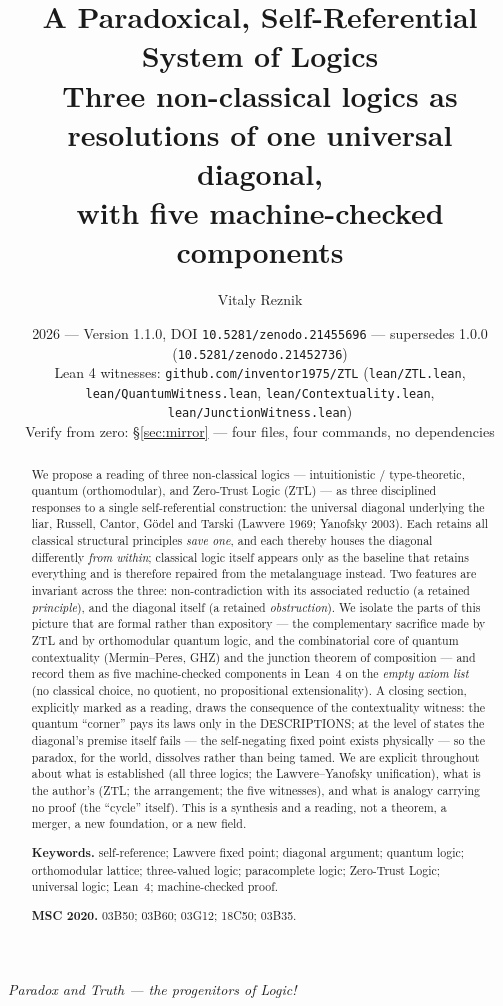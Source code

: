 \documentclass[11pt]{article}
\title{\textbf{A Paradoxical, Self-Referential System of Logics}\\[4pt]
\large Three non-classical logics as resolutions of one universal diagonal,\\
with five machine-checked components}
\author{Vitaly Reznik}
\date{2026 --- Version 1.1.0, DOI \texttt{10.5281/zenodo.21455696} --- supersedes 1.0.0 (\texttt{10.5281/zenodo.21452736})\\[2pt]
\small Lean 4 witnesses: \texttt{github.com/inventor1975/ZTL}
(\texttt{lean/ZTL.lean}, \texttt{lean/QuantumWitness.lean}, \texttt{lean/Contextuality.lean}, \texttt{lean/JunctionWitness.lean})\\
\small Verify from zero: \S\ref{sec:mirror} --- four files, four commands, no dependencies}
\theoremstyle{remark}
\begin{document}
\maketitle

\begin{center}
\emph{Paradox and Truth --- the progenitors of Logic!}
\end{center}
\vspace{4pt}

\begin{abstract}
We propose a reading of three non-classical logics ---
intuitionistic / type-theoretic, quantum (orthomodular), and Zero-Trust
Logic (ZTL) --- as three disciplined responses to a single self-referential
construction: the universal diagonal underlying the liar, Russell, Cantor,
G\"odel and Tarski (Lawvere 1969; Yanofsky 2003). Each retains all classical
structural principles \emph{save one}, and each thereby houses the diagonal
differently \emph{from within}; classical logic itself appears only as the
baseline that retains everything and is therefore repaired from the
metalanguage instead. Two features are invariant across the three: non-contradiction
with its associated reductio (a retained \emph{principle}), and the diagonal
itself (a retained \emph{obstruction}). We isolate the parts of this
picture that are formal rather than expository --- the complementary sacrifice
made by ZTL and by orthomodular quantum logic, and the combinatorial core of
quantum contextuality (Mermin--Peres, GHZ) and the junction theorem of
composition --- and record them as five machine-checked components in Lean~4 on the \emph{empty axiom list} (no
classical choice, no quotient, no propositional extensionality). A closing
section, explicitly marked as a reading, draws the consequence of the
contextuality witness: the quantum ``corner'' pays its laws only in the
DESCRIPTIONS; at the level of states the diagonal's premise itself fails ---
the self-negating fixed point exists physically --- so the paradox, for the
world, dissolves rather than being tamed. We are
explicit throughout about what is established (all three logics; the
Lawvere--Yanofsky unification), what is the author's (ZTL; the arrangement;
the five witnesses), and what is analogy carrying no proof (the ``cycle''
itself). This is a synthesis and a reading, not a theorem, a merger, a new
foundation, or a new field.

\smallskip
\noindent\textbf{Keywords.} self-reference; Lawvere fixed point; diagonal
argument; quantum logic; orthomodular lattice; three-valued logic;
paracomplete logic; Zero-Trust Logic; universal logic; Lean~4;
machine-checked proof.

\smallskip
\noindent\textbf{MSC 2020.} 03B50; 03B60; 03G12; 18C50; 03B35.
\end{abstract}
\end{document}
